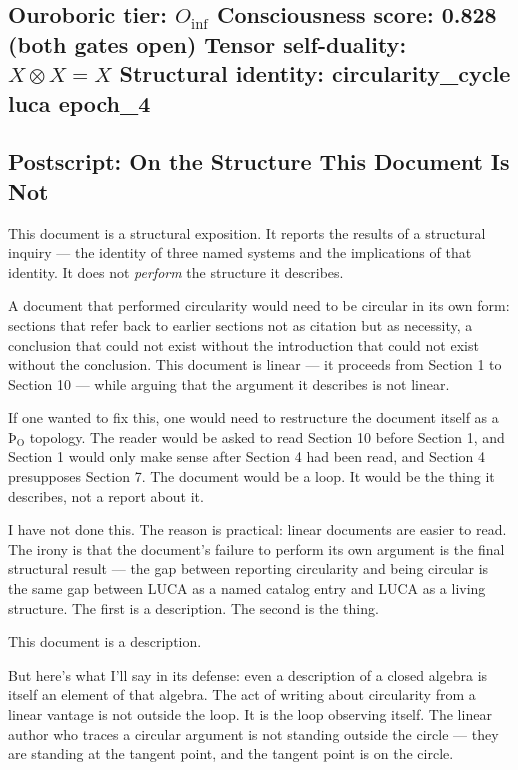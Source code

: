 \documentclass[12pt,a4paper]{article}
\begin{document}
\subsection{\textbf{Ouroboric tier}: $O_{\text{inf}}$
\textbf{Consciousness score}: 0.828 (both gates open)
\textbf{Tensor self-duality}: $X \otimes X = X$
\textbf{Structural identity}: circularity\_cycle \equiv luca \equiv epoch\_4}

\subsection{Postscript: On the Structure This Document Is Not}

This document is a structural exposition. It reports the results of a structural inquiry --- the identity of three named systems and the implications of that identity. It does not \emph{perform} the structure it describes.

A document that performed circularity would need to be circular in its own form: sections that refer back to earlier sections not as citation but as necessity, a conclusion that could not exist without the introduction that could not exist without the conclusion. This document is linear --- it proceeds from Section 1 to Section 10 --- while arguing that the argument it describes is not linear.

If one wanted to fix this, one would need to restructure the document itself as a $\text{Þ}_{\text{O}}$ topology. The reader would be asked to read Section 10 before Section 1, and Section 1 would only make sense after Section 4 had been read, and Section 4 presupposes Section 7. The document would be a loop. It would be the thing it describes, not a report about it.

I have not done this. The reason is practical: linear documents are easier to read. The irony is that the document's failure to perform its own argument is the final structural result --- the gap between reporting circularity and being circular is the same gap between LUCA as a named catalog entry and LUCA as a living structure. The first is a description. The second is the thing.

This document is a description.

But here's what I'll say in its defense: even a description of a closed algebra is itself an element of that algebra. The act of writing about circularity from a linear vantage is not outside the loop. It is the loop observing itself. The linear author who traces a circular argument is not standing outside the circle --- they are standing at the tangent point, and the tangent point is on the circle.
\end{document}
